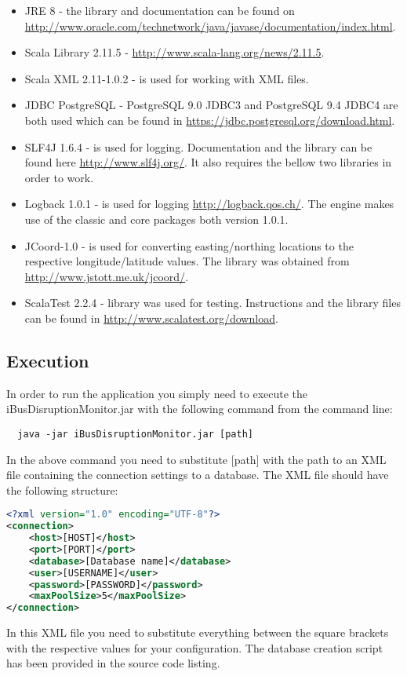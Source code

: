 \begin{itemize}
\item JRE 8 - the library and documentation can be found on \url{http://www.oracle.com/technetwork/java/javase/documentation/index.html}.
\item Scala Library 2.11.5 - \url{http://www.scala-lang.org/news/2.11.5}.
\item Scala XML 2.11-1.0.2 - is used for working with XML files.
\item JDBC PostgreSQL - PostgreSQL 9.0 JDBC3 and PostgreSQL 9.4 JDBC4 are both used which can be found in \url{https://jdbc.postgresql.org/download.html}.
\item SLF4J 1.6.4 - is used for logging. Documentation and the library can be found here \url{http://www.slf4j.org/}. It also requires the bellow two libraries in order to work.
\item Logback 1.0.1 - is used for logging \url{http://logback.qos.ch/}. The engine makes use of the classic and core packages both version 1.0.1.
\item JCoord-1.0 - is used for converting easting/northing locations to the respective longitude/latitude values. The library was obtained from \url{http://www.jstott.me.uk/jcoord/}.
\item ScalaTest 2.2.4 - library was used for testing. Instructions and the library files can be found in \url{http://www.scalatest.org/download}.
\end{itemize}

\subsection{Execution}
In order to run the application you simply need to execute the iBusDisruptionMonitor.jar with the following command from the command line:
\begin{lstlisting}
  java -jar iBusDisruptionMonitor.jar [path]
\end{lstlisting}
In the above command you need to substitute [path] with the path to an XML file containing the connection settings to a database. The XML file should have the following structure:
\begin{lstlisting}[language=XML]
 <?xml version="1.0" encoding="UTF-8"?>
<connection>
    <host>[HOST]</host>
    <port>[PORT]</port>
    <database>[Database name]</database>
    <user>[USERNAME]</user>
    <password>[PASSWORD]</password>
    <maxPoolSize>5</maxPoolSize>
</connection>
\end{lstlisting}
In this XML file you need to substitute everything between the square brackets with the respective values for your configuration. The database creation script has been provided in the source code listing. 

